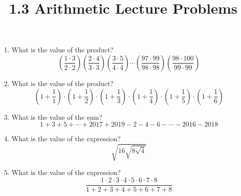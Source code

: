 \documentclass{article}
\title{1.3 Arithmetic Lecture Problems}
\author{}
\date{}
\begin{document}
\maketitle

\begin{enumerate}
    \item What is the value of the product?
        \[ \left(\frac{1 \cdot 3}{2 \cdot 2}\right) \left(\frac{2 \cdot 4}{3 \cdot 3}\right) \left(\frac{3 \cdot 5}{4 \cdot 4}\right) \cdots \left(\frac{97 \cdot 99}{98 \cdot 98}\right) \left(\frac{98 \cdot 100}{99 \cdot 99}\right) \]
        \vspace{3cm}
    \item What is the value of the product?
        \[ \left( 1 + \frac{1}{1}\right) \cdot \left( 1 + \frac{1}{2}\right) \cdot \left( 1 + \frac{1}{3}\right) \cdot \left( 1 + \frac{1}{4}\right) \cdot \left( 1 + \frac{1}{5}\right) \cdot \left( 1 + \frac{1}{6}\right) \]
        \vspace{3cm}
    \item What is the value of the sum?
        \[ 1 + 3 + 5 + \cdots + 2017 + 2019 - 2 - 4 - 6 - \cdots - 2016 - 2018 \]
        \vspace{3cm}
    \item What is the value of the expression?
        \[ \sqrt{16 \sqrt{8 \sqrt{4}}} \]
        \vspace{3cm}
        \newpage
    \item What is the value of the expression?
        \[ \frac{1 \cdot 2 \cdot 3 \cdot 4 \cdot 5 \cdot 6 \cdot 7 \cdot 8}{1 + 2 + 3+ 4 + 5 + 6 + 7 + 8} \]
        \vspace{3cm}
\end{enumerate}
\end{document}

